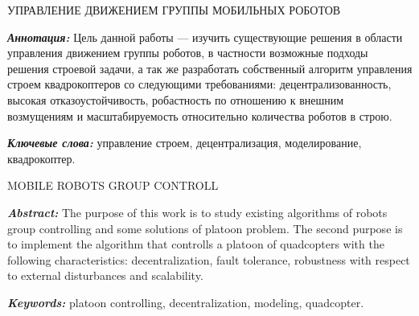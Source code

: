 \documentclass[a4paper, 14pt]{extarticle}
\begin{document}
\large{УПРАВЛЕНИЕ ДВИЖЕНИЕМ ГРУППЫ МОБИЛЬНЫХ РОБОТОВ}\par
\bigskip
\textbf{\textit{Аннотация:}} Цель данной работы — изучить существующие решения в области управления движением группы роботов, в частности возможные подходы решения строевой задачи, а так же разработать собственный алгоритм управления строем квадрокоптеров со следующими требованиями: децентрализованность, высокая отказоустойчивость, робастность по отношению к внешним возмущениям и масштабируемость относительно количества роботов в строю. \par
\textbf{\textit{Ключевые слова:}} управление строем, децентрализация, моделирование, квадрокоптер. \par
\vspace{1cm}
\large{MOBILE ROBOTS GROUP CONTROLL}\par
\bigskip
\textbf{\textit{Abstract:}} The purpose of this work is to study existing algorithms of robots group controlling and some solutions of platoon problem. The second purpose is to implement the algorithm that controlls a platoon of quadcopters with the following characteristics: decentralization, 
fault tolerance, robustness with respect to external disturbances and scalability.  \par
\textbf{\textit{Keywords:}} platoon controlling, decentralization, modeling, quadcopter. \par
\end{document}
